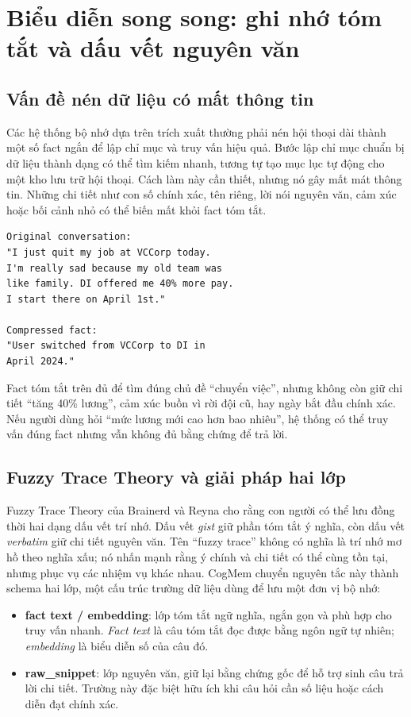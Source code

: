 \documentclass[../main.tex]{subfiles}
\begin{document}
\section{Biểu diễn song song: ghi nhớ tóm tắt và dấu vết nguyên văn}

\subsection{Vấn đề nén dữ liệu có mất thông tin}

Các hệ thống bộ nhớ dựa trên trích xuất thường phải nén hội thoại dài thành một số fact ngắn để lập chỉ mục và truy vấn hiệu quả. Bước lập chỉ mục chuẩn bị dữ liệu thành dạng có thể tìm kiếm nhanh, tương tự tạo mục lục tự động cho một kho lưu trữ hội thoại. Cách làm này cần thiết, nhưng nó gây mất mát thông tin. Những chi tiết như con số chính xác, tên riêng, lời nói nguyên văn, cảm xúc hoặc bối cảnh nhỏ có thể biến mất khỏi fact tóm tắt.

\begin{lstlisting}
Original conversation:
"I just quit my job at VCCorp today.
I'm really sad because my old team was
like family. DI offered me 40% more pay.
I start there on April 1st."

Compressed fact:
"User switched from VCCorp to DI in
April 2024."
\end{lstlisting}

Fact tóm tắt trên đủ để tìm đúng chủ đề ``chuyển việc'', nhưng không còn giữ chi tiết ``tăng 40\% lương'', cảm xúc buồn vì rời đội cũ, hay ngày bắt đầu chính xác. Nếu người dùng hỏi ``mức lương mới cao hơn bao nhiêu'', hệ thống có thể truy vấn đúng fact nhưng vẫn không đủ bằng chứng để trả lời.

\subsection{Fuzzy Trace Theory và giải pháp hai lớp}

Fuzzy Trace Theory của Brainerd và Reyna cho rằng con người có thể lưu đồng thời hai dạng dấu vết trí nhớ. Dấu vết \textit{gist} giữ phần tóm tắt ý nghĩa, còn dấu vết \textit{verbatim} giữ chi tiết nguyên văn. Tên ``fuzzy trace'' không có nghĩa là trí nhớ mơ hồ theo nghĩa xấu; nó nhấn mạnh rằng ý chính và chi tiết có thể cùng tồn tại, nhưng phục vụ các nhiệm vụ khác nhau. CogMem chuyển nguyên tắc này thành schema hai lớp, một cấu trúc trường dữ liệu dùng để lưu một đơn vị bộ nhớ:

\begin{itemize}
    \item \textbf{fact text / embedding}: lớp tóm tắt ngữ nghĩa, ngắn gọn và phù hợp cho truy vấn nhanh. \textit{Fact text} là câu tóm tắt đọc được bằng ngôn ngữ tự nhiên; \textit{embedding} là biểu diễn số của câu đó.
    \item \textbf{raw\_snippet}: lớp nguyên văn, giữ lại bằng chứng gốc để hỗ trợ sinh câu trả lời chi tiết. Trường này đặc biệt hữu ích khi câu hỏi cần số liệu hoặc cách diễn đạt chính xác.
\end{itemize}
\end{document}

